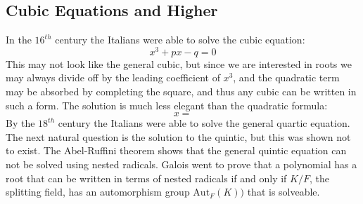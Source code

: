 \subsection{Cubic Equations and Higher}
    In the $16^{th}$ century the Italians were able to solve the cubic
    equation:
    \begin{equation}
        x^{3}+px-q=0
    \end{equation}
    This may not look like the general cubic, but since we are
    interested in roots we may always divide off by the leading
    coefficient of $x^{3}$, and the quadratic term may be
    absorbed by completing the square, and thus any cubic can be
    written in such a form. The solution is much less elegant than the
    quadratic formula:
    \begin{equation}
        x=
    \end{equation}
    By the $18^{th}$ century the Italians were able to solve the general
    quartic equation. The next natural question is the solution to the
    quintic, but this was shown not to exist. The Abel-Ruffini theorem
    shows that the general quintic equation can not be solved using
    nested radicals. Galois went to prove that a polynomial has a root
    that can be written in terms of nested radicals if and only if
    $K/F$, the splitting field, has an automorphism group
    $\textrm{Aut}_{F}(K))$ that is solveable.
